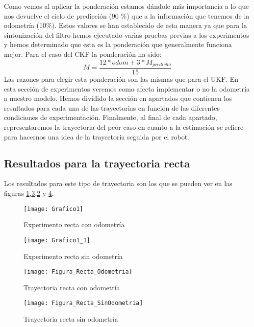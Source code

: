 Como vemos al aplicar la ponderación estamos dándole más importancia a lo que nos devuelve el ciclo de predicción (90 $\%$) que a la información que tenemos de la odometría (10$\%$).
Estos valores se han establecido de esta manera ya que para la sintonización del filtro hemos ejecutado varias pruebas previas a los experimentos y hemos determinado que esta es la ponderación que generalmente funciona mejor.
Para el caso del \ac{CKF} la ponderación ha sido:
\begin{equation}\label{Ec:Ponderacion_CKF}
M = \frac{12*odom+3*M_{predicha}}{15}
\end{equation}
Las razones para elegir esta ponderación son las mismas que para el \ac{UKF}.
En esta sección de  experimentos veremos como afecta implementar o no la odometría a nuestro modelo.
Hemos dividido la sección en apartados que contienen los resultados para cada una de las trayectorias en función de las diferentes condiciones de experimentación.
Finalmente, al final de cada apartado, representaremos la trayectoria del peor caso en cuanto a la estimación se refiere para hacernos una idea de la trayectoria seguida por el robot.
\subsection{Resultados para la trayectoria recta}
Los resultados para este tipo de trayectoria son los que se pueden ver en las figuras \ref{Grafico1},\ref{Figura1},\ref{Grafico1_1} y \ref{Figura1_1}.
\begin{figure}[ht!]
\centering
\texttt{[image: Grafico1]}
\caption{Experimento recta con odometría} \label{Grafico1}
\end{figure}
\begin{figure}[ht!]
\centering
\texttt{[image: Grafico1\_1]}
\caption{Experimento recta sin odometría} \label{Grafico1_1}
\end{figure}
\begin{figure}[ht!]
\centering
\texttt{[image: Figura\_Recta\_Odometria]}
\caption{Trayectoria recta con odometría} \label{Figura1}
\end{figure}

\begin{figure}[ht!]
\texttt{[image: Figura\_Recta\_SinOdometria]}
\caption{Trayectoria recta sin odometría} \label{Figura1_1}
\end{figure}

